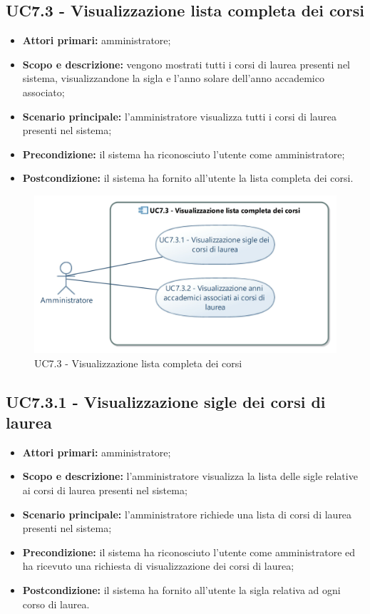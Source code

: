\documentclass[AnalisiDeiRequisiti.tex]{subfiles}
\begin{document}

\subsection{UC7.3 - Visualizzazione lista completa dei corsi}
\begin{itemize}
	\item \textbf{Attori primari:} amministratore;
	\item \textbf{Scopo e descrizione:} vengono mostrati tutti i corsi di laurea presenti nel sistema, visualizzandone la sigla e l'anno solare dell'anno accademico associato;
	\item \textbf{Scenario principale:} l'amministratore visualizza tutti i corsi di laurea presenti nel sistema;
	\item \textbf{Precondizione:} il sistema ha riconosciuto l'utente come amministratore; 
	\item \textbf{Postcondizione:} il sistema ha fornito all'utente la lista completa dei corsi.
\end{itemize}
\begin{figure}[H]
	\centering
	\includegraphics[width=0.8\linewidth]{UC7_3.jpg}
	\caption{UC7.3 - Visualizzazione lista completa dei corsi}
	\label{fig:UC7.3 - Visualizzazione lista completa dei corsi}
\end{figure}
\subsection{UC7.3.1 - Visualizzazione sigle dei corsi di laurea}
\begin{itemize}
	\item \textbf{Attori primari:} amministratore;
	\item \textbf{Scopo e descrizione:} l'amministratore visualizza la lista delle sigle relative ai corsi di laurea presenti nel sistema;
	\item \textbf{Scenario principale:} l'amministratore richiede una lista di corsi di laurea presenti nel sistema;
	\item \textbf{Precondizione:} il sistema ha riconosciuto l'utente come amministratore ed ha ricevuto una richiesta di visualizzazione dei corsi di laurea; 
	\item \textbf{Postcondizione:} il sistema ha fornito all'utente la sigla relativa ad ogni corso di laurea.
\end{itemize}
\end{document}
